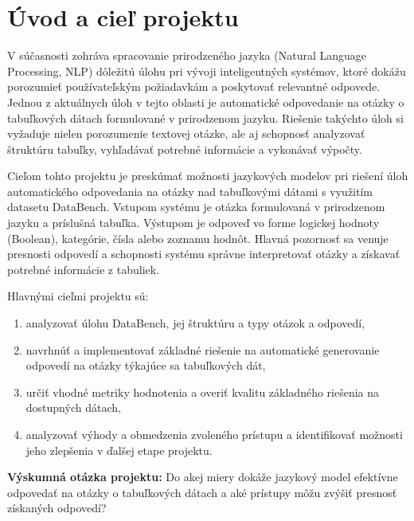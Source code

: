 \section{Úvod a cieľ projektu}

V súčasnosti zohráva spracovanie prirodzeného jazyka (Natural Language Processing, NLP) dôležitú úlohu pri vývoji inteligentných systémov, ktoré dokážu porozumieť používateľským požiadavkám a poskytovať relevantné odpovede. Jednou z aktuálnych úloh v tejto oblasti je automatické odpovedanie na otázky o tabuľkových dátach formulované v prirodzenom jazyku. Riešenie takýchto úloh si vyžaduje nielen porozumenie textovej otázke, ale aj schopnosť analyzovať štruktúru tabuľky, vyhľadávať potrebné informácie a vykonávať výpočty.

Cieľom tohto projektu je preskúmať možnosti jazykových modelov pri riešení úloh automatického odpovedania na otázky nad tabuľkovými dátami s využitím datasetu DataBench. Vstupom systému je otázka formulovaná v prirodzenom jazyku a príslušná tabuľka. Výstupom je odpoveď vo forme logickej hodnoty (Boolean), kategórie, čísla alebo zoznamu hodnôt. Hlavná pozornosť sa venuje presnosti odpovedí a schopnosti systému správne interpretovať otázky a získavať potrebné informácie z tabuliek.

Hlavnými cieľmi projektu sú:
\begin{enumerate}
    \item analyzovať úlohu DataBench, jej štruktúru a typy otázok a odpovedí,
    \item navrhnúť a implementovať základné riešenie na automatické generovanie odpovedí na otázky týkajúce sa tabuľkových dát,
    \item určiť vhodné metriky hodnotenia a overiť kvalitu základného riešenia na dostupných dátach,
    \item analyzovať výhody a obmedzenia zvoleného prístupu a identifikovať možnosti jeho zlepšenia v ďalšej etape projektu.
\end{enumerate}

\textbf{Výskumná otázka projektu:} Do akej miery dokáže jazykový model efektívne odpovedať na otázky o tabuľkových dátach a aké prístupy môžu zvýšiť presnosť získaných odpovedí?
